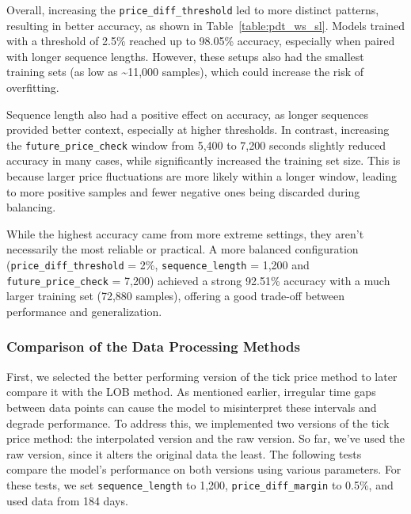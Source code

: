 \documentclass[a4paper,oneside,onecolumn,12pt]{book}
\begin{document}
		Overall, increasing the \texttt{price\_diff\_threshold} led to more distinct patterns, resulting in better accuracy, as shown in Table~\ref{table:pdt_ws_sl}. Models trained with a threshold of 2.5\% reached up to 98.05\% accuracy, especially when paired with longer sequence lengths. However, these setups also had the smallest training sets (as low as \textasciitilde11,000 samples), which could increase the risk of overfitting.

		Sequence length also had a positive effect on accuracy, as longer sequences provided better context, especially at higher thresholds. In contrast, increasing the \texttt{future\_price\_check} window from 5,400 to 7,200 seconds slightly reduced accuracy in many cases, while significantly increased the training set size. This is because larger price fluctuations are more likely within a longer window, leading to more positive samples and fewer negative ones being discarded during balancing.

		While the highest accuracy came from more extreme settings, they aren't necessarily the most reliable or practical. A more balanced configuration (\texttt{price\_diff\_threshold} = 2\%, \texttt{sequence\_length} = 1,200 and \texttt{future\_price\_check} = 7,200) achieved a strong 92.51\% accuracy with a much larger training set (72,880 samples), offering a good trade-off between performance and generalization.

		\subsubsection{Comparison of the Data Processing Methods}
		First, we selected the better performing version of the tick price method to later compare it with the LOB method. As mentioned earlier, irregular time gaps between data points can cause the model to misinterpret these intervals and degrade performance. To address this, we implemented two versions of the tick price method: the interpolated version and the raw version. So far, we've used the raw version, since it alters the original data the least. The following tests compare the model's performance on both versions using various parameters. For these tests, we set \texttt{sequence\_length} to 1,200, \texttt{price\_diff\_margin} to 0.5\%, and used data from 184 days.
\end{document}
